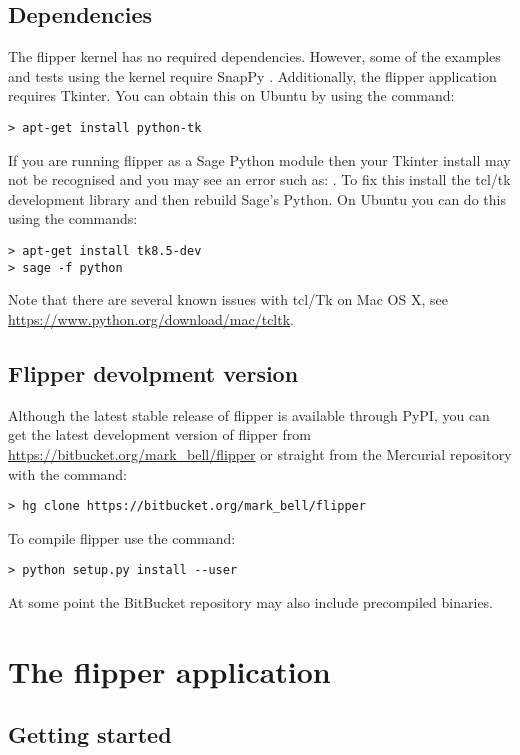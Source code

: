 \documentclass[a4paper]{article}
\newcommand{\exc}[1]{\mbox{\PVerb{#1}}}
\begin{document}
\subsection{Dependencies}

The flipper kernel has no required dependencies. However, some of the examples and tests using the kernel require SnapPy \cite{SnapPy}. Additionally, the flipper application requires Tkinter. You can obtain this on Ubuntu by using the command:
\begin{lstlisting}
> apt-get install python-tk
\end{lstlisting}
If you are running flipper as a Sage Python module then your Tkinter install may not be recognised and you may see an error such as: \exc{Error: no module named _tkinter}. To fix this install the tcl/tk development library and then rebuild Sage's Python. On Ubuntu you can do this using the commands:
\begin{lstlisting}
> apt-get install tk8.5-dev
> sage -f python
\end{lstlisting}
Note that there are several known issues with tcl/Tk on Mac OS X, see \url{https://www.python.org/download/mac/tcltk}.

\subsection{Flipper devolpment version}
Although the latest stable release of flipper is available through PyPI, you can get the latest development version of flipper from \url{https://bitbucket.org/mark_bell/flipper} or straight from the Mercurial \cite{mercurial} repository with the command:
\begin{lstlisting}
> hg clone https://bitbucket.org/mark_bell/flipper
\end{lstlisting}
To compile flipper use the command:
\begin{lstlisting}
> python setup.py install --user
\end{lstlisting}

At some point the BitBucket repository may also include precompiled binaries.

\section{The flipper application}

\subsection{Getting started}
\end{document}
